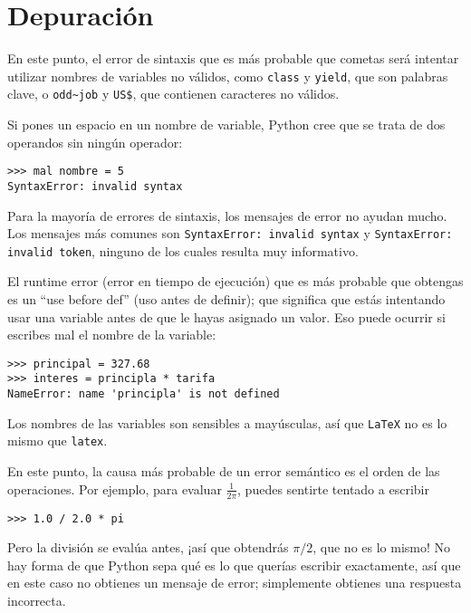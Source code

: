 \section{Depuración}

En este punto, el error de sintaxis que es más probable que cometas será
intentar utilizar nombres de variables no válidos, como {\tt class} y {\tt yield}, que
son palabras clave, o \verb"odd~job" y \verb"US$", que contienen
caracteres no válidos.


Si pones un espacio en un nombre de variable, Python cree que se trata
de dos operandos sin ningún operador:

\beforeverb
\begin{verbatim}
>>> mal nombre = 5
SyntaxError: invalid syntax
\end{verbatim}
\afterverb
%
Para la mayoría de errores de sintaxis, los mensajes de error no ayudan mucho.
Los mensajes más comunes son {\tt SyntaxError: invalid syntax} y
{\tt SyntaxError: invalid token}, ninguno de los cuales resulta muy informativo.


El runtime error (error en tiempo de ejecución) que es más probable que obtengas es un
``use before def'' (uso antes de definir); que significa que estás intentando usar una variable
antes de que le hayas asignado un valor. Eso puede ocurrir si escribes mal el nombre de la variable: 

\beforeverb
\begin{verbatim}
>>> principal = 327.68
>>> interes = principla * tarifa
NameError: name 'principla' is not defined
\end{verbatim}
\afterverb
%
Los nombres de las variables son sensibles a mayúsculas, así que {\tt LaTeX} no es
lo mismo que {\tt latex}.


En este punto, la causa más probable de un error semántico es
el orden de las operaciones. Por ejemplo, para evaluar $\frac{1}{2 \pi}$,
puedes sentirte tentado a escribir

\beforeverb
\begin{verbatim}
>>> 1.0 / 2.0 * pi
\end{verbatim}
\afterverb
%
Pero la división se evalúa antes, ¡así que obtendrás $\pi / 2$, que
no es lo mismo! No hay forma de que Python
sepa qué es lo que querías escribir exactamente, así que en este caso no
obtienes un mensaje de error; simplemente obtienes una respuesta incorrecta.

